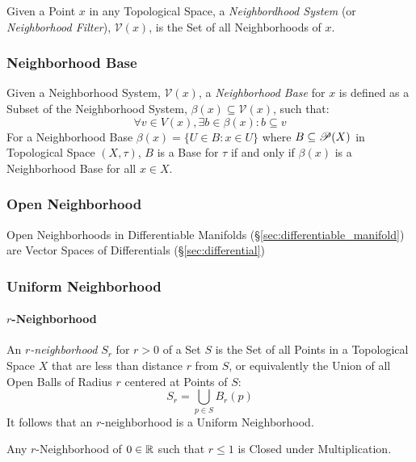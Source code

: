 Given a Point $x$ in any Topological Space, a \emph{Neighbordhood
  System} (or \emph{Neighborhood Filter}), $\mathcal{V}(x)$, is the
Set of all Neighborhoods of $x$.



\subsubsection{Neighborhood Base}\label{sec:neighborhood_base}

Given a Neighborhood System, $\mathcal{V}(x)$, a \emph{Neighborhood
  Base} for $x$ is defined as a Subset of the Neighborhood System,
$\beta(x) \subseteq \mathcal{V}(x)$, such that:
\[
  \forall v \in V(x), \exists b \in \beta(x) : b \subseteq v
\]
For a Neighborhood Base $\beta(x) = \{ U \in B : x \in U \}$ where $B
\subseteq \mathscr{P}(X)$ in Topological Space $(X,\tau)$, $B$ is a
Base for $\tau$ if and only if $\beta(x)$ is a Neighborhood Base for
all $x \in X$.



\subsubsection{Open Neighborhood}\label{sec:open_neighborhood}

Open Neighborhoods in Differentiable Manifolds
(\S\ref{sec:differentiable_manifold}) are Vector Spaces of Differentials
(\S\ref{sec:differential})



\subsubsection{Uniform Neighborhood}\label{sec:uniform_neighborhood}

\paragraph{$r$-Neighborhood}\label{sec:r_neighborhood}\hfill

An \emph{$r$-neighborhood} $S_r$ for $r > 0$ of a Set $S$ is the Set of all
Points in a Topological Space $X$ that are less than distance $r$ from $S$, or
equivalently the Union of all Open Balls of Radius $r$ centered at Points of
$S$:
\[
  S_r = \bigcup_{p \in S} B_r (p)
\]
It follows that an $r$-neighborhood is a Uniform Neighborhood.

Any $r$-Neighborhood of $0 \in \mathbb{R}$ such that $r \leq 1$ is Closed under
Multiplication.



